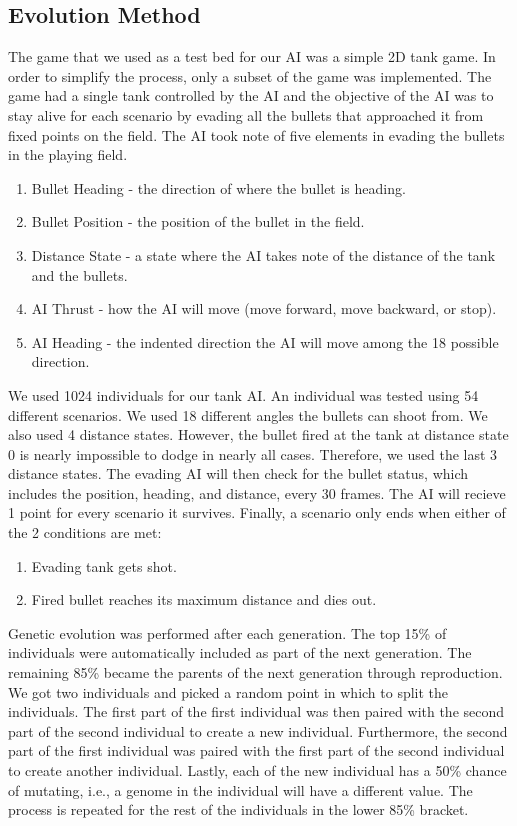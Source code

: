 \subsection{Evolution Method}
The game that we used as a test bed for our AI was a simple 2D tank game.
In order to simplify the process, only a subset of the game was implemented.
The game had a single tank controlled by the AI and the objective of the AI
was to stay alive for each scenario by evading all the bullets that approached
it from fixed points on the field. The AI took note of five elements in evading the
bullets in the playing field.

\begin{enumerate}
 \item Bullet Heading - the direction of where the bullet is heading.
 \item Bullet Position - the position of the bullet in the field.
 \item Distance State - a state where the AI takes note of the distance 
of the tank and the bullets.
 \item AI Thrust - how the AI will move (move forward, move backward, or stop).
 \item AI Heading - the indented direction the AI will move among the 18
possible direction.
\end{enumerate}

We used 1024 individuals for our tank AI. An individual was tested using 54 different
scenarios. We used 18 different angles the bullets can shoot from. We also used 4
distance states. However, the bullet fired at the tank at distance state 0 is nearly
impossible to dodge in nearly all cases. Therefore, we used the last 3 distance states.
The evading AI will then check for the bullet status, which includes the position, heading,
and distance, every 30 frames. The AI will recieve 1 point for every scenario it survives.
Finally, a scenario only ends when either of the 2 conditions are met:

\begin{enumerate}
 \item Evading tank gets shot.
 \item Fired bullet reaches its maximum distance and dies out.
\end{enumerate}

Genetic evolution was performed after each generation. The top 15\% of individuals
were automatically included as part of the next generation. The remaining 85\% became
the parents of the next generation through reproduction. We got two individuals and
picked a random point in which to split the individuals. The first part of the 
first individual was then paired with the second part of the second individual to 
create a new individual. Furthermore, the second part of the first individual was
paired with the first part of the second individual to create another individual.
Lastly, each of the new individual has a 50\% chance of mutating, i.e., a genome
in the individual will have a different value. The process is repeated for the
rest of the individuals in the lower 85\% bracket.


